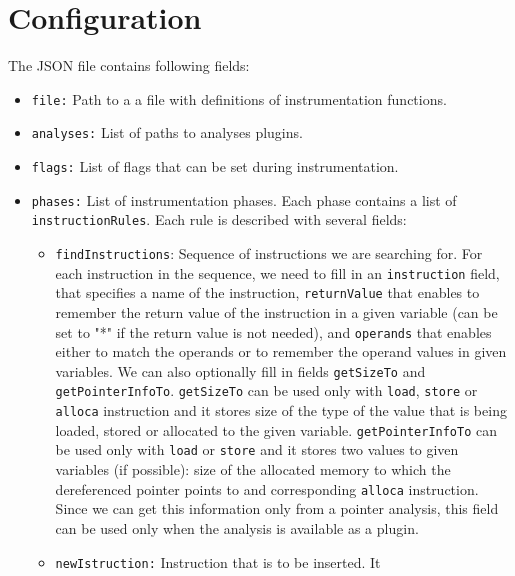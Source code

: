 \section{Configuration}


The JSON file contains following fields:

\medskip
\begin{itemize}
\item \texttt{file:} Path to a a file with definitions of instrumentation functions.
\item \texttt{analyses:} List of paths to analyses plugins.
\item \texttt{flags:} List of flags that can be set during instrumentation.
\item \texttt{phases:} List of instrumentation phases. Each phase contains a
  list of \texttt{instructionRules}. Each rule is described with several fields:
  \begin{itemize}
    \item \texttt{findInstructions}: Sequence of instructions we are searching
    for. For each instruction in the sequence, we need to fill in an
        \texttt{instruction} field, that specifies a name of the instruction,
        \texttt{returnValue} that enables to remember the return value of the
        instruction in a given variable (can be set to "*" if the return value
        is not needed), and \texttt{operands} that enables either to match the
        operands or to remember the operand values in given variables. We can
        also optionally fill in fields \texttt{getSizeTo} and
        \texttt{getPointerInfoTo}. \texttt{getSizeTo} can be used only with
        \texttt{load}, \texttt{store} or \texttt{alloca} instruction and it
        stores size of the type of the value that is being loaded, stored or
        allocated to the given variable. \texttt{getPointerInfoTo} can be used
        only with \texttt{load} or \texttt{store} and it stores two values to
        given variables (if possible): size of the allocated memory to which
        the dereferenced pointer points to and corresponding \texttt{alloca}
        instruction. Since we can get this information only from a pointer
        analysis, this field can be used only when the analysis is available as
        a plugin.
    \item \texttt{newIstruction:} Instruction that is to be inserted. It

\end{itemize}
\end{itemize}
